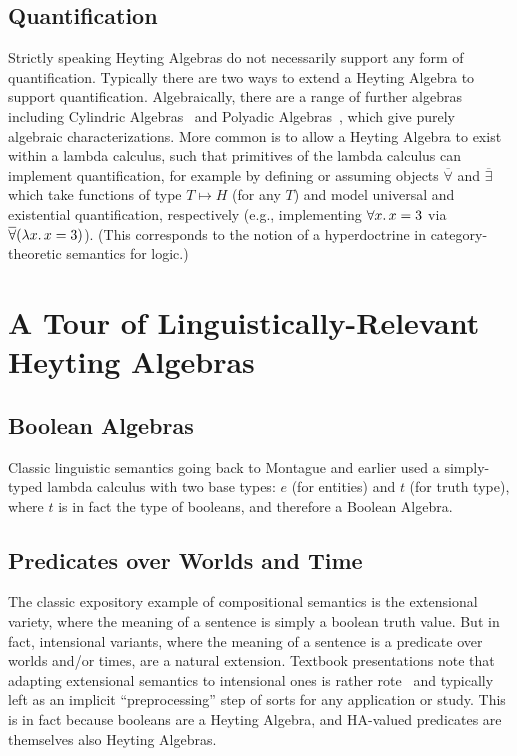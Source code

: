 \documentclass[11pt,a4paper,acceptedWithA]{article}
\begin{document}
\subsection{Quantification}
Strictly speaking Heyting Algebras do not necessarily support any form of quantification.
Typically there are two ways to extend a Heyting Algebra to support quantification.
Algebraically, there are a range of further algebras including Cylindric Algebras~ and Polyadic Algebras~, which give purely algebraic characterizations.
More common is to allow a Heyting Algebra to exist within a lambda calculus, such that primitives of the lambda calculus can implement quantification, for example by defining or assuming objects $\overline\forall$ and $\overline\exists$ which take functions of type $T\mapsto H$ (for any $T$) and model universal and existential quantification, respectively (e.g., implementing $\forall x\ldotp x = 3$ via $\overline\forall(\lambda x\ldotp x = 3)$).
(This corresponds to the notion of a hyperdoctrine in category-theoretic semantics for logic.)


\section{A Tour of Linguistically-Relevant Heyting Algebras}

\subsection{Boolean Algebras}
Classic linguistic semantics going back to Montague and earlier used a simply-typed lambda calculus with two base types: $e$ (for entities) and $t$ (for truth type), where $t$ is in fact the type of booleans, and therefore a Boolean Algebra.

\subsection{Predicates over Worlds and Time}
The classic expository example of compositional semantics is the extensional variety, where the meaning of a sentence is simply a boolean truth value.  But in fact, intensional variants, where the meaning of a sentence is a predicate over worlds and/or times, are a natural extension. Textbook presentations note that adapting extensional semantics to intensional ones is rather rote~\cite[Sec.~6.6]{jacobson2014compositional} and typically left as an implicit ``preprocessing'' step of sorts for any application or study.  This is in fact because booleans are a Heyting Algebra, and HA-valued predicates are themselves also Heyting Algebras.
\end{document}
